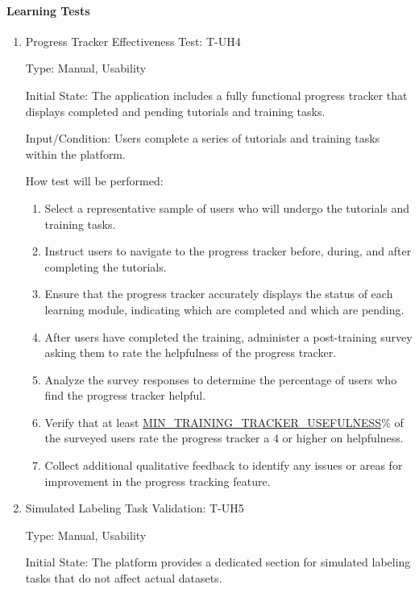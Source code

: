 \documentclass[12pt, titlepage]{article}
\begin{document}
\paragraph{Learning Tests}
\begin{enumerate}

\item{Progress Tracker Effectiveness Test: T-UH4\\}

Type: Manual, Usability

Initial State: The application includes a fully functional progress tracker that displays completed and pending tutorials and training tasks.

Input/Condition: Users complete a series of tutorials and training tasks within the platform.

How test will be performed:
\begin{enumerate}
    \item Select a representative sample of users who will undergo the tutorials and training tasks.
    \item Instruct users to navigate to the progress tracker before, during, and after completing the tutorials.
    \item Ensure that the progress tracker accurately displays the status of each learning module, indicating which are completed and which are pending.
    \item After users have completed the training, administer a post-training survey asking them to rate the helpfulness of the progress tracker.
    \item Analyze the survey responses to determine the percentage of users who find the progress tracker helpful.
    \item Verify that at least \hyperref[MIN_TRAINING_TRACKER_USEFULNESS]{MIN\_TRAINING\_TRACKER\_USEFULNESS}\% of the surveyed users rate the progress tracker a 4 or higher on helpfulness.
    \item Collect additional qualitative feedback to identify any issues or areas for improvement in the progress tracking feature.
\end{enumerate}

\item{Simulated Labeling Task Validation: T-UH5\\}

Type: Manual, Usability

Initial State: The platform provides a dedicated section for simulated labeling tasks that do not affect actual datasets.


\end{enumerate}
\end{document}
